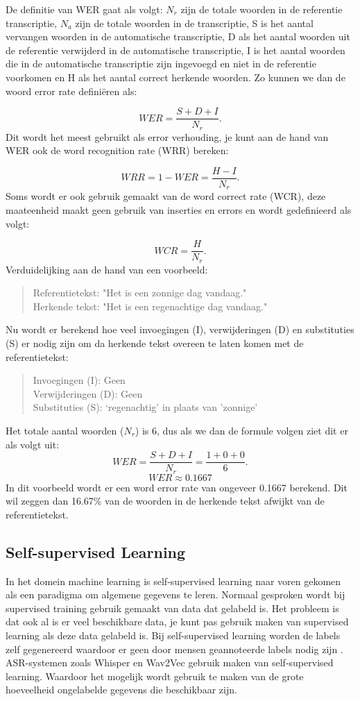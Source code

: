 De definitie van WER gaat als volgt: $N_r$ zijn de totale woorden in de referentie transcriptie, $N_a$ zijn de totale woorden in de transcriptie, S is het aantal vervangen woorden in de automatische transcriptie, D als het aantal woorden uit de referentie verwijderd in de automatische transcriptie, I is het aantal woorden die in de automatische transcriptie zijn ingevoegd en niet in de referentie voorkomen en H als het aantal correct herkende woorden. Zo kunnen we dan de woord error rate definiëren als: \par 
\[WER = \frac{S + D + I}{N_r}.\]
Dit wordt het meest gebruikt als error verhouding, je kunt aan de hand van WER ook de word recognition rate (WRR) bereken: \par
\[WRR = 1 - WER = \frac{H-I}{N_r} .\]
Soms wordt er ook gebruik gemaakt van de word correct rate (WCR), deze maateenheid maakt geen gebruik van inserties en errors en wordt gedefinieerd als volgt: \par
\[WCR = \frac{H}{N_r} .\] \autocite{mccowan2004use}  
Verduidelijking aan de hand van een voorbeeld: 
\begin{quote}
    Referentietekst: "Het is een zonnige dag vandaag."\\
    Herkende tekst: "Het is een regenachtige dag vandaag."
\end{quote}
Nu wordt er berekend hoe veel invoegingen (I), verwijderingen (D) en substituties (S) er nodig zijn om da herkende tekst overeen te laten komen met de referentietekst:
\begin{quote}
Invoegingen (I): Geen\\
Verwijderingen (D): Geen\\
Substituties (S): `regenachtig' in plaats van 'zonnige'
\end{quote}
Het totale aantal woorden ($N_r$) is 6, dus als we dan de formule volgen ziet dit er als volgt uit:
\[WER = \frac{S + D + I}{N_r} = \frac{1+0+0}{6}.\]
\[WER ≈ 0.1667\]
In dit voorbeeld wordt er een word error rate van ongeveer 0.1667 berekend. Dit wil zeggen dan 16.67\% van de woorden in de herkende tekst afwijkt van de referentietekst.
\subsection{Self-supervised Learning}
In het domein machine learning is self-supervised learning naar voren gekomen als een paradigma om algemene gegevens te leren. Normaal gesproken wordt bij supervised training gebruik gemaakt van data dat gelabeld is. Het probleem is dat ook al is er veel beschikbare data, je kunt pas gebruik maken van supervised learning als deze data gelabeld is. Bij self-supervised learning worden de labels zelf gegenereerd waardoor er geen door mensen geannoteerde labels nodig zijn \autocite{Jaiswal2021}. ASR-systemen zoals Whisper en Wav2Vec gebruik maken van  self-supervised learning. Waardoor het mogelijk wordt gebruik te maken van de grote hoeveelheid ongelabelde gegevens die beschikbaar zijn.

